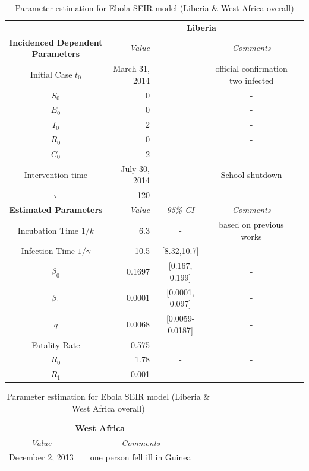 \documentclass[10pt, journal,onecolumn]{IEEEtran}
\newcommand{\ra}[1]{\renewcommand{\arraystretch}{#1}}
\begin{document}
\begin{appendix}
\begin{table}[h]
\caption{Parameter estimation for Ebola SEIR model (Liberia \& West Africa overall)}
\centering
\tiny
\parbox{.55\linewidth}
{\centering
\ra{1.3}
\begin{tabular}{@{}crccc@{}}%
& \multicolumn{3}{c}{\textbf{Liberia}} &  \\
\cmidrule{2-4}
\textbf{Incidenced Dependent Parameters} & \textit{Value} && \textit{Comments} \\
\midrule
Initial Case $t_0$ & March 31, 2014 &  & official confirmation two infected \cite{}\\
$S_0$ & 0& & -\\
$E_0$ & 0& & -\\
$I_0$ & 2& & -\\
$R_0$ & 0& & -\\
$C_0$ & 2& &-\\
Intervention time & July 30, 2014 &  & School shutdown\\
$\tau$ &120 & & -\\
\midrule
\textbf{Estimated Parameters} & \textit{Value} & \textit{95\% CI} & \textit{Comments} \\
\midrule
Incubation Time $1/k$ &6.3 & - & based on previous works \cite{}\\
Infection Time $1/\gamma$ &10.5 & [8.32,10.7] & -\\
$\beta_0$ &0.1697 & [0.167, 0.199] & -\\
$\beta_1$ &0.0001 & [0.0001, 0.097] & -\\
$q$ &0.0068 & [0.0059-0.0187] & -\\
Fatality Rate &0.575 & - & -\\
$R_0$ &1.78 &- &-\\
$R_1$ &0.001 & - &-\\
\end{tabular}
}
\parbox{.3\linewidth}
{\centering
\ra{1.3}
\begin{tabular}{@{}crccc@{}}%
\multicolumn{3}{c}{\textbf{West Africa}} &  \\
\cmidrule{1-3}
 \textit{Value} && \textit{Comments} \\
\midrule
December 2, 2013 &  & one person fell ill in Guinea\\

\end{tabular}}
\end{table}
\end{appendix}
\end{document}
